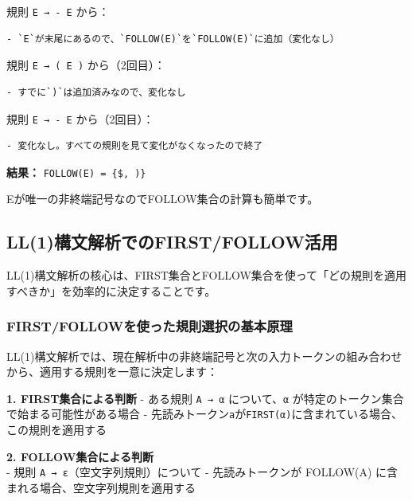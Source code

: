 規則 \texttt{E\ →\ -\ E} から：

\begin{verbatim}
- `E`が末尾にあるので、`FOLLOW(E)`を`FOLLOW(E)`に追加（変化なし）
\end{verbatim}

規則 \texttt{E\ →\ (\ E\ )} から（2回目）：

\begin{verbatim}
- すでに`)`は追加済みなので、変化なし
\end{verbatim}

規則 \texttt{E\ →\ -\ E} から（2回目）：

\begin{verbatim}
- 変化なし。すべての規則を見て変化がなくなったので終了
\end{verbatim}

\textbf{結果：}
\texttt{FOLLOW(E)\ =\ \{\$,\ \textquotesingle{})\textquotesingle{}\}}

Eが唯一の非終端記号なのでFOLLOW集合の計算も簡単です。

\hypertarget{chapter5-ll1ux69cbux6587ux89e3ux6790ux3067ux306efirstfollowux6d3bux7528}{%
\subsection{LL(1)構文解析でのFIRST/FOLLOW活用}\label{chapter5-ll1ux69cbux6587ux89e3ux6790ux3067ux306efirstfollowux6d3bux7528}}

LL(1)構文解析の核心は、FIRST集合とFOLLOW集合を使って「どの規則を適用すべきか」を効率的に決定することです。

\hypertarget{chapter5-firstfollowux3092ux4f7fux3063ux305fux898fux5247ux9078ux629eux306eux57faux672cux539fux7406}{%
\subsubsection{FIRST/FOLLOWを使った規則選択の基本原理}\label{chapter5-firstfollowux3092ux4f7fux3063ux305fux898fux5247ux9078ux629eux306eux57faux672cux539fux7406}}

LL(1)構文解析では、現在解析中の非終端記号と次の入力トークンの組み合わせから、適用する規則を一意に決定します：

\textbf{1. FIRST集合による判断} - ある規則 \texttt{A\ →\ α}
について、\texttt{α} が特定のトークン集合で始まる可能性がある場合 -
先読みトークン\texttt{a}が\texttt{FIRST(α)}に含まれている場合、この規則を適用する

\textbf{2. FOLLOW集合による判断}\\
- 規則 \texttt{A\ →\ ε}（空文字列規則）について - 先読みトークンが
FOLLOW(A) に含まれる場合、空文字列規則を適用する


